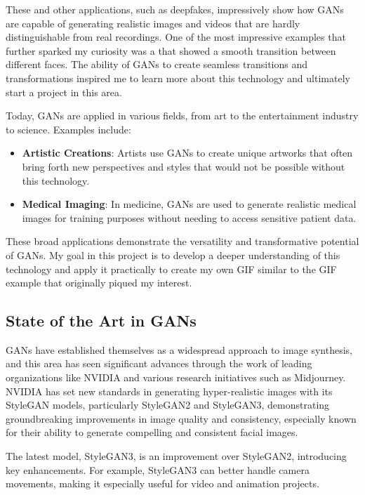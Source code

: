 \documentclass[a4paper, 12pt]{article}
\begin{document}
These and other applications, such as deepfakes, impressively show how GANs are capable of generating realistic images and videos that are hardly distinguishable from real recordings. One of the most impressive examples that further sparked my curiosity was a \cite{gif_example} that showed a smooth transition between different faces. The ability of GANs to create seamless transitions and transformations inspired me to learn more about this technology and ultimately start a project in this area.

Today, GANs are applied in various fields, from art to the entertainment industry to science. Examples include:
\begin{itemize}
  \item \textbf{Artistic Creations}: Artists use GANs to create unique artworks that often bring forth new perspectives and styles that would not be possible without this technology.\cite{kunstloft_article}
  \item \textbf{Medical Imaging}: In medicine, GANs are used to generate realistic medical images for training purposes without needing to access sensitive patient data.\cite{avinci_ai_gans}
\end{itemize}

These broad applications demonstrate the versatility and transformative potential of GANs. My goal in this project is to develop a deeper understanding of this technology and apply it practically to create my own GIF similar to the GIF example that originally piqued my interest.

\subsection{State of the Art in GANs}
GANs have established themselves as a widespread approach to image synthesis, and this area has seen significant advances through the work of leading organizations like NVIDIA and various research initiatives such as Midjourney. NVIDIA has set new standards in generating hyper-realistic images with its StyleGAN models, particularly StyleGAN2 and StyleGAN3, demonstrating groundbreaking improvements in image quality and consistency, especially known for their ability to generate compelling and consistent facial images.\cite{StyleGAN3, StyleGAN3_Github, StyleGAN2}

The latest model, StyleGAN3, is an improvement over StyleGAN2, introducing key enhancements. For example, StyleGAN3 can better handle camera movements, making it especially useful for video and animation projects.\cite{StyleGAN3_next}
\end{document}

